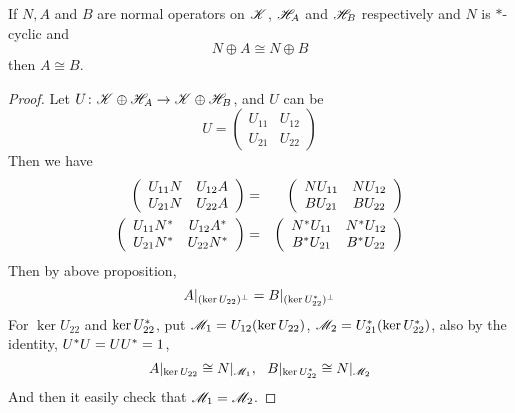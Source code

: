 \documentclass[a4paper,11pt]{report}
\begin{document}
\begin{prop}
	If $N,A$ and $B$ are normal operators on $\mathscr{K}$, $\mathscr{H}_A$ and $\mathscr{H}_B$ respectively and $N$ is $*$-cyclic and 
	\begin{equation*}
		N \oplus A \cong N \oplus B
	\end{equation*}
	then $A \cong B$.
\end{prop}
\begin{proof}
	Let $U \colon \mathscr{K} \oplus \mathscr{H}_A \rightarrow \mathscr{K} \oplus \mathscr{H}_B$, and $U$ can be
	\begin{equation*}
		U = \left(
			\begin{array}{cc}
				U_{11} & U_{12} \\
				U_{21} & U_{22}
			\end{array}
		\right)
	\end{equation*}
	Then we have
	\begin{eqnarray*}
		\left(
			\begin{array}{cc}
				U_{11}N & U_{12}A \\
				U_{21}N & U_{22}A
			\end{array}
		\right)
		&=& \left(
			\begin{array}{cc}
				NU_{11} & NU_{12} \\
				BU_{21} & BU_{22}
			\end{array}
		\right) \\
		\left(
			\begin{array}{cc}
				U_{11}N^{*} & U_{12}A^{*} \\
				U_{21}N^{*} & U_{22}N^{*}
			\end{array}
		\right)
		&=&\left(
			\begin{array}{cc}
				N^{*}U_{11} & N^{*}U_{12} \\
				B^{*}U_{21} & B^{*}U_{22}
			\end{array}
		\right)
	\end{eqnarray*}
	Then by above proposition, 
	\begin{equation*}
		A|_{(\ker{U_{22}})^{\bot}} = B|_{(\ker{U_{22}^{*}})^{\bot}}
	\end{equation*}
	For $\ker{U_{22}}$ and $\ker{U_{22}^{*}}$, put $\mathscr{M}_1 = U_{12}(\ker{U_{22}})$, $\mathscr{M}_2= U_{21}^{*}(\ker{U_{22}^{*}})$, also by the identity, $U^{*}U = UU^{*} = 1$, 
	\begin{equation*}
		A|_{\ker{U_{22}}} \cong N|_{\mathscr{M}_1},~~B|_{\ker{U_{22}^{*}}} \cong N|_{\mathscr{M}_2}
	\end{equation*}
	And then it easily check that $\mathscr{M}_1 = \mathscr{M}_2$.
\end{proof}
\end{document}
